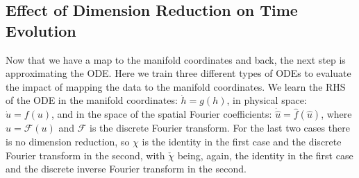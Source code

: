 \documentclass[preprint,aps,pre,letterpaper,onecolumn,superscriptaddress]{revtex4-2} %
\begin{document}
\subsection{Effect of Dimension Reduction on Time Evolution}\label{sec:dimredev}

Now that we have a map to the manifold coordinates and back, the next step is approximating the ODE. Here we train three different types of ODEs to evaluate the impact of mapping the data to the manifold coordinates. We learn the RHS of the ODE in the manifold coordinates: $\dot{h}=g(h)$, in physical space: $\dot{u}=f(u)$, and in the space of the spatial Fourier coefficients: $\dot{\hat{u}}=\hat{f}(\hat{u})$, where $\hat{u}=\mathcal{F}(u)$ and $\mathcal{F}$ is the discrete Fourier transform. For the last two cases there is no dimension reduction, so $\chi$ is the identity in the first case and the discrete Fourier transform in the second, with $\check{\chi}$ being, again, the identity in the first case and the discrete inverse Fourier transform in the second.

\end{document}
